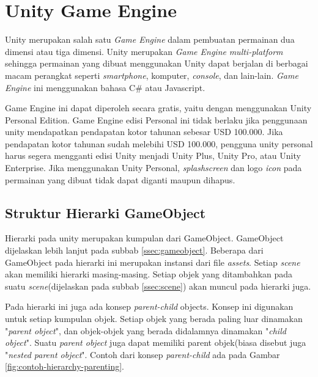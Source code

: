 \section{Unity Game Engine}
\label{sec:unity_game_engine}

Unity merupakan salah satu \textit{Game Engine} dalam pembuatan permainan dua dimensi atau tiga dimensi\cite{unity}. Unity merupakan \textit{Game Engine} \textit{multi-platform} sehingga permainan yang dibuat menggunakan Unity dapat berjalan di berbagai macam perangkat seperti \textit{smartphone}, komputer, \textit{console}, dan lain-lain.  \textit{Game Engine} ini menggunakan bahasa C\# atau Javascript.

Game Engine ini dapat diperoleh secara gratis, yaitu dengan menggunakan Unity Personal Edition. Game Engine edisi Personal ini tidak berlaku jika penggunaan unity mendapatkan pendapatan kotor tahunan sebesar USD 100.000. Jika pendapatan kotor tahunan sudah melebihi USD 100.000, pengguna unity personal harus segera mengganti edisi Unity menjadi Unity Plus, Unity Pro, atau Unity Enterprise. Jika menggunakan Unity Personal, \textit{splashscreen} dan logo \textit{icon} pada permainan yang dibuat tidak dapat diganti maupun dihapus. 


 \subsection{Struktur Hierarki GameObject}
 \label{ssec:struktur_hierarki_gameobject}
 
 Hierarki pada unity merupakan kumpulan dari GameObject. GameObject dijelaskan lebih lanjut pada subbab \ref{ssec:gameobject}. Beberapa dari GameObject pada hierarki ini merupakan instansi dari file \textit{assets}. Setiap \textit{scene} akan memiliki hierarki masing-masing. Setiap objek yang ditambahkan pada suatu \textit{scene}(dijelaskan pada subbab \ref{ssec:scene}) akan muncul pada hierarki juga.
 
 Pada hierarki ini juga ada konsep \textit{parent-child} objects. Konsep ini digunakan untuk setiap kumpulan objek. Setiap objek yang berada paling luar dinamakan "\textit{parent object}", dan objek-objek  yang berada didalamnya dinamakan "\textit{child object}". Suatu \textit{parent object} juga dapat memiliki parent objek(biasa disebut juga "\textit{nested parent object}". Contoh dari konsep \textit{parent-child} ada pada Gambar \ref{fig:contoh-hierarchy-parenting}.
 
